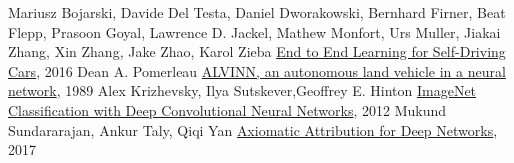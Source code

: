 
 Mariusz Bojarski,
               Davide Del Testa,
               Daniel Dworakowski,
               Bernhard Firner,
               Beat Flepp,
               Prasoon Goyal,
               Lawrence D. Jackel,
               Mathew Monfort,
               Urs Muller,
               Jiakai Zhang,
               Xin Zhang,
               Jake Zhao,
               Karol Zieba \href{https://arxiv.org/abs/1604.07316}{End to End Learning for Self-Driving Cars}, 2016
 Dean A. Pomerleau \href{http://repository.cmu.edu/compsci/1875/}{ALVINN, an autonomous land vehicle in a neural network}, 1989
 Alex Krizhevsky, Ilya Sutskever,Geoffrey E. Hinton  \href{https://www.cs.toronto.edu/~kriz/imagenet_classification_with_deep_convolutional.pdf}{ImageNet Classification with Deep Convolutional Neural Networks}, 2012
 Mukund Sundararajan, Ankur Taly, Qiqi Yan  \href{https://arxiv.org/abs/1703.01365}{Axiomatic Attribution for Deep Networks}, 2017
